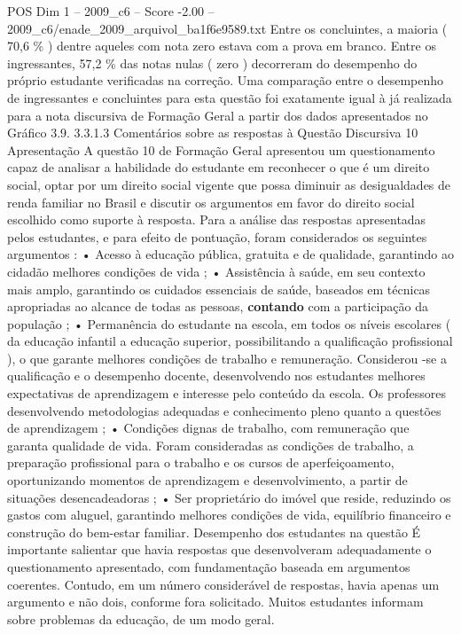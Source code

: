\begin{textsample}{POS Dim 1 – 2009\_c6 – Score -2.00 – 2009\_c6/enade\_2009\_arquivol\_ba1f6e9589.txt}
Entre os concluintes, a maioria ( 70,6 \% ) dentre aqueles com nota zero estava com a prova em branco.
Entre os ingressantes, 57,2 \% das notas nulas ( zero ) decorreram do desempenho do próprio estudante verificadas na correção.
Uma comparação entre o desempenho de ingressantes e concluintes para esta questão foi exatamente igual à já realizada para a nota discursiva de Formação Geral a partir dos dados apresentados no Gráfico 3.9. 3.3.1.3 Comentários sobre as respostas à Questão Discursiva 10 Apresentação A questão 10 de Formação Geral apresentou um questionamento capaz de analisar a habilidade do estudante em reconhecer o que é um direito social, optar por um direito social vigente que possa diminuir as desigualdades de renda familiar no Brasil e discutir os argumentos em favor do direito social escolhido como suporte à resposta.
Para a análise das respostas apresentadas pelos estudantes, e para efeito de pontuação, foram considerados os seguintes argumentos : • Acesso à educação pública, gratuita e de qualidade, garantindo ao cidadão melhores condições de vida ; • Assistência à saúde, em seu contexto mais amplo, garantindo os cuidados essenciais de saúde, baseados em técnicas apropriadas ao alcance de todas as pessoas, \textbf{contando} com a participação da população ; • Permanência do estudante na escola, em todos os níveis escolares ( da educação infantil a educação superior, possibilitando a qualificação profissional ), o que garante melhores condições de trabalho e remuneração.
Considerou -se a qualificação e o desempenho docente, desenvolvendo nos estudantes melhores expectativas de aprendizagem e interesse pelo conteúdo da escola.
Os professores desenvolvendo metodologias adequadas e conhecimento pleno quanto a questões de aprendizagem ; • Condições dignas de trabalho, com remuneração que garanta qualidade de vida.
Foram consideradas as condições de trabalho, a preparação profissional para o trabalho e os cursos de aperfeiçoamento, oportunizando momentos de aprendizagem e desenvolvimento, a partir de situações desencadeadoras ; • Ser proprietário do imóvel que reside, reduzindo os gastos com aluguel, garantindo melhores condições de vida, equilíbrio financeiro e construção do bem-estar familiar.
Desempenho dos estudantes na questão É importante salientar que havia respostas que desenvolveram adequadamente o questionamento apresentado, com fundamentação baseada em argumentos coerentes.
Contudo, em um número considerável de respostas, havia apenas um argumento e não dois, conforme fora solicitado.
Muitos estudantes informam sobre problemas da educação, de um modo geral.

\end{textsample}
